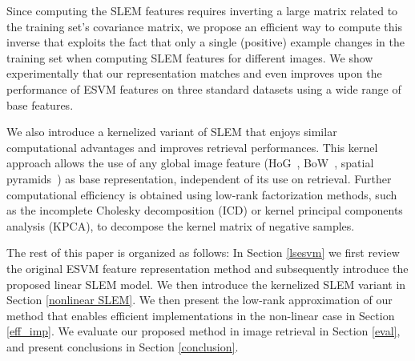 Since computing the SLEM features requires inverting a large matrix related to the training set's covariance matrix, we propose an efficient way to compute this inverse that exploits the fact that only a single (positive) example changes in the training set when computing SLEM features for different images. We show experimentally that our representation matches and even improves upon the performance of ESVM features on three standard datasets using a wide range of base features.

We also introduce a kernelized variant of SLEM that enjoys similar computational advantages and improves retrieval performances. 
This kernel approach allows the use of any global image feature (\eg HoG~\cite{hog}, BoW~\cite{BoW04}, spatial pyramids~\cite{spk}) as base representation, independent of its use on retrieval.
Further computational efficiency is obtained using low-rank factorization methods, such as the incomplete Cholesky decomposition (ICD) or kernel principal components analysis (KPCA), to decompose the kernel matrix of negative samples.

The rest of this paper is organized as follows:
In Section \ref{lsesvm} we first review the original ESVM feature representation method and subsequently introduce the proposed linear SLEM model. We then introduce the kernelized SLEM variant in Section \ref{nonlinear SLEM}. We then present the low-rank approximation of our method that enables efficient implementations in the non-linear case in Section \ref{eff_imp}. We evaluate our proposed method in image retrieval in Section \ref{eval}, and present conclusions in Section \ref{conclusion}.









